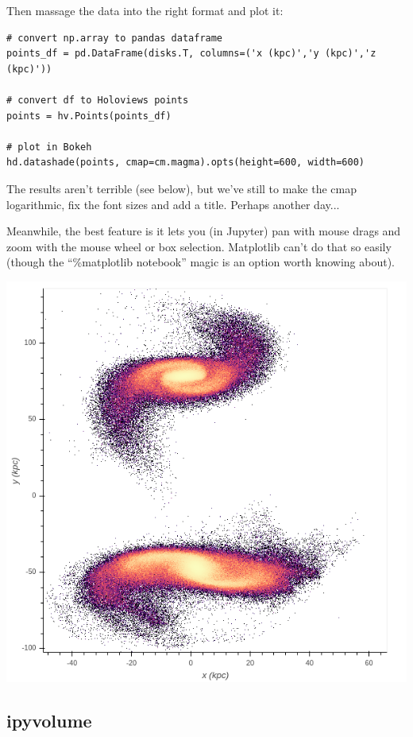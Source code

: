 Then massage the data into the right format and plot it:

\begin{lstlisting}
# convert np.array to pandas dataframe
points_df = pd.DataFrame(disks.T, columns=('x (kpc)','y (kpc)','z (kpc)'))

# convert df to Holoviews points
points = hv.Points(points_df)

# plot in Bokeh
hd.datashade(points, cmap=cm.magma).opts(height=600, width=600)
\end{lstlisting}

The results aren't terrible (see below), but we've still to make the cmap logarithmic, fix the font sizes and add a title. Perhaps another day...

Meanwhile, the best feature is it lets you (in Jupyter) pan with mouse drags and zoom with the mouse wheel or box selection. Matplotlib can't do that so easily (though the ``\%matplotlib notebook'' magic is an option worth knowing about).

{\centering \includegraphics[scale=0.55]{bokeh_datashade} \par}


\subsection{ipyvolume}

